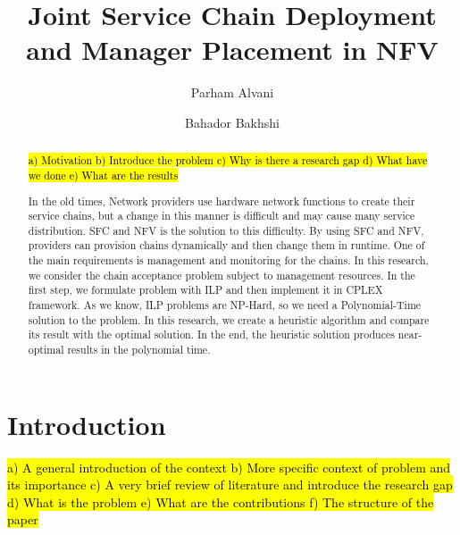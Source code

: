 \documentclass[preprint,review,12pt]{elsarticle}
\newcommand{\hly}[2][yellow]{ {\sethlcolor{#1} \hl{#2}} }
\begin{document}
\begin{frontmatter}

\title{Joint Service Chain Deployment and Manager Placement in NFV}

\author[aut]{Parham Alvani
}
\author[aut]{Bahador Bakhshi
}


\address[aut]{Amirkabir University of Technology, Tehran, Iran}

\begin{abstract}
\hly{
a) Motivation
b) Introduce the problem
c) Why is there a research gap
d) What have we done
e) What are the results
}

In the old times, Network providers use hardware network functions to create their service chains, but a change in this manner is difficult and may cause many service distribution.
SFC and NFV is the solution to this difficulty. By using SFC and NFV, providers can provision chains dynamically and then change them in runtime.
One of the main requirements is management and monitoring for the chains.
In this research, we consider the chain acceptance problem subject to management resources. In the first step, we formulate
problem with ILP and then implement it in CPLEX framework. As we know, ILP problems are NP-Hard, so we need a Polynomial-Time solution to the problem.
In this research, we create a heuristic algorithm and compare its result with the optimal solution. In the end, the heuristic solution produces near-optimal results in the polynomial time.
\end{abstract}

\begin{keyword}
\end{keyword}

\end{frontmatter}

\section{Introduction}

\hly{
a) A general introduction of the context
b) More specific context of problem and its importance
c) A very brief review of literature and introduce the research gap
d) What is the problem
e) What are the contributions
f) The structure of the paper
}
\end{document}
